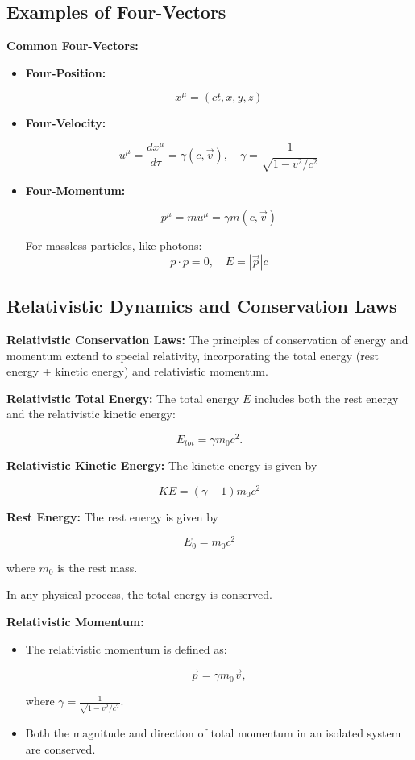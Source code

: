 \documentclass{article}
\newcommand{\eqbox}[1]{\begin{tcolorbox}[colback=gray!10] #1 \end{tcolorbox}}
\newcommand{\conceptbox}[1]{\begin{tcolorbox}[colback=blue!10] #1 \end{tcolorbox}}
\begin{document}
\subsection{Examples of Four-Vectors}
\conceptbox{
\textbf{Common Four-Vectors:}
\begin{itemize}
    \item \textbf{Four-Position:} 
    \eqbox{
    \[
    x^\mu = (ct, x, y, z)
    \]
    }
    \item \textbf{Four-Velocity:} 
    \eqbox{
    \[
    u^\mu = \frac{dx^\mu}{d\tau} = \gamma (c, \vec{v}), \quad \gamma = \frac{1}{\sqrt{1 - v^2/c^2}}
    \]
    }
    \item \textbf{Four-Momentum:} 
    \eqbox{
    \[
    p^\mu = m u^\mu = \gamma m (c, \vec{v})
    \]
    }
    \eqbox{
    For massless particles, like photons:
    \[
    p \cdot p = 0, \quad E = |\vec{p}|c
    \]
    }
\end{itemize}
}

\subsection{Relativistic Dynamics and Conservation Laws}

\conceptbox{
\textbf{Relativistic Conservation Laws:}
The principles of conservation of energy and momentum extend to special relativity, incorporating the total energy (rest energy + kinetic energy) and relativistic momentum.
}

\conceptbox{
    \textbf{Relativistic Total Energy:}
    The total energy \( E \) includes both the rest energy and the relativistic kinetic energy:
    \eqbox{
    \[
    E_{tot} = \gamma m_0 c^2.
    \]
    }
    \textbf{Relativistic Kinetic Energy:} 
    The kinetic energy is given by
    \eqbox{
        \[
            KE = (\gamma - 1)m_0c^2
        \]
    }
    \textbf{Rest Energy:}
    The rest energy is given by
    \eqbox{\[ E_0 = m_0 c^2 \]} where \( m_0 \) is the rest mass.
    \vspace{1em}

    In any physical process, the total energy is conserved.
}
\conceptbox{
    \textbf{Relativistic Momentum:}
    \begin{itemize}
        \item The relativistic momentum is defined as:
        \eqbox{
        \[
        \vec{p} = \gamma m_0 \vec{v},
        \]
        }
        where \( \gamma = \frac{1}{\sqrt{1 - v^2/c^2}} \).
        \item Both the magnitude and direction of total momentum in an isolated system are conserved.
    \end{itemize}
}
\end{document}
